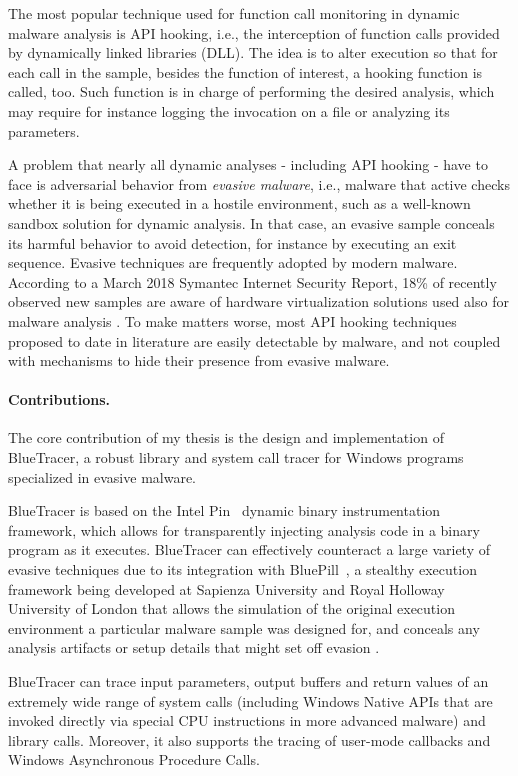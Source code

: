 The most popular technique used for function call monitoring in dynamic malware analysis is API hooking, i.e., the interception of function calls provided by dynamically linked libraries (DLL). The idea is to alter execution so that for each call in the sample, besides the function of interest, a hooking function is called, too. Such function is in charge of performing the desired analysis, which may require for instance logging the invocation on a file or analyzing its parameters.

A problem that nearly all dynamic analyses - including API hooking - have to face is adversarial behavior from \textit{evasive malware}, i.e., malware that active checks whether it is being executed in a hostile environment, such as a well-known sandbox solution for dynamic analysis. In that case, an evasive sample conceals its harmful behavior to avoid detection, for instance by executing an exit sequence. Evasive techniques are frequently adopted by modern malware. According to a March 2018 Symantec Internet Security Report, 18\% of recently observed new samples are aware of hardware virtualization solutions used also for malware analysis \cite{Symantec}. To make matters worse, most API hooking techniques proposed to date in literature are easily detectable by malware, and not coupled with mechanisms to hide their presence from evasive malware.

\paragraph{Contributions.}The core contribution of my thesis is the design and implementation of BlueTracer, a robust library and system call tracer for Windows programs specialized in evasive malware.

BlueTracer is based on the Intel Pin~\cite{Luk05} dynamic binary instrumentation framework, which allows for transparently injecting analysis code in a binary program as it executes. BlueTracer can effectively counteract a large variety of evasive techniques due to its integration with BluePill~\cite{BluePill}, a stealthy execution framework being developed at Sapienza University and Royal Holloway University of London that allows the simulation of the original execution environment a particular malware sample was designed for, and conceals any analysis artifacts or setup details that might set off evasion \cite{BluePill}.

BlueTracer can trace input parameters, output buffers and return values of an extremely wide range of system calls (including Windows Native APIs that are invoked directly via special CPU instructions in more advanced malware) and library calls. Moreover, it also supports the tracing of user-mode callbacks and Windows Asynchronous Procedure Calls. 

